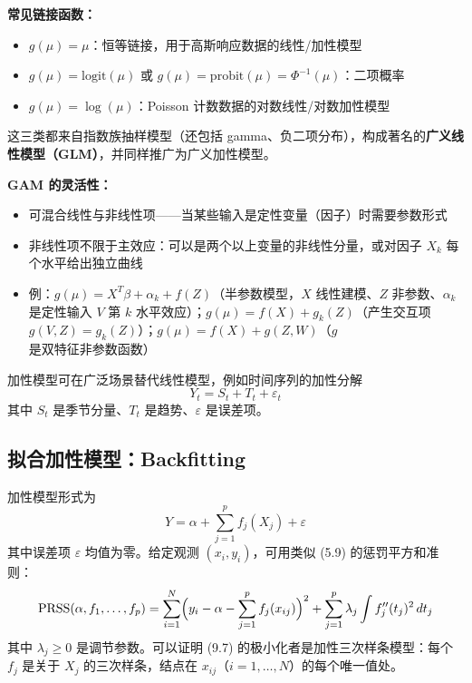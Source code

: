 \textbf{常见链接函数：}
\begin{itemize}
    \item $g(\mu) = \mu$：恒等链接，用于高斯响应数据的线性/加性模型
    \item $g(\mu) = \mathrm{logit}(\mu)$ 或 $g(\mu) = \mathrm{probit}(\mu) = \Phi^{-1}(\mu)$：二项概率
    \item $g(\mu) = \log(\mu)$：Poisson 计数数据的对数线性/对数加性模型
\end{itemize}
这三类都来自指数族抽样模型（还包括 gamma、负二项分布），构成著名的\textbf{广义线性模型（GLM）}，并同样推广为广义加性模型。

\textbf{GAM 的灵活性：}
\begin{itemize}
    \item 可混合线性与非线性项——当某些输入是定性变量（因子）时需要参数形式
    \item 非线性项不限于主效应：可以是两个以上变量的非线性分量，或对因子 $X_k$ 每个水平给出独立曲线
    \item 例：$g(\mu) = X^T\beta + \alpha_k + f(Z)$（半参数模型，$X$ 线性建模、$Z$ 非参数、$\alpha_k$ 是定性输入 $V$ 第 $k$ 水平效应）；$g(\mu) = f(X) + g_k(Z)$（产生交互项 $g(V,Z) = g_k(Z)$）；$g(\mu) = f(X) + g(Z,W)$（$g$ 是双特征非参数函数）
\end{itemize}

加性模型可在广泛场景替代线性模型，例如时间序列的加性分解
\begin{equation}\label{eq:9_5}
    Y_t = S_t + T_t + \varepsilon_t
\end{equation}
其中 $S_t$ 是季节分量、$T_t$ 是趋势、$\varepsilon$ 是误差项。

\subsection{拟合加性模型：Backfitting}

加性模型形式为
\begin{equation}\label{eq:9_6}
    Y = \alpha + \sum_{j=1}^{p} f_j(X_j) + \varepsilon
\end{equation}
其中误差项 $\varepsilon$ 均值为零。给定观测 $(x_i, y_i)$，可用类似 (5.9) 的惩罚平方和准则：
\begin{equation}\label{eq:9_7}
    \mathrm{PRSS}(\alpha, f_1, \ldots, f_p) = \sum_{i=1}^{N}\Bigl(y_i - \alpha - \sum_{j=1}^{p} f_j(x_{ij})\Bigr)^2 + \sum_{j=1}^{p} \lambda_j \int f_j''(t_j)^2\,dt_j
\end{equation}
其中 $\lambda_j \ge 0$ 是调节参数。可以证明 (9.7) 的极小化者是加性三次样条模型：每个 $f_j$ 是关于 $X_j$ 的三次样条，结点在 $x_{ij}$（$i = 1, \ldots, N$）的每个唯一值处。


